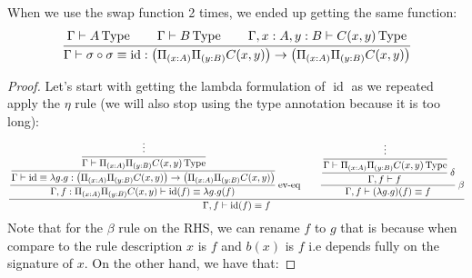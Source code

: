 \begin{lemma}
    \label{lemma:swap-two-time}
    When we use the swap function 2 times, we ended up getting the same function:
    \begin{equation*}
        \cfrac{\Gamma\vdash A\operatorname{Type} \qquad \Gamma\vdash B\operatorname{Type}\qquad \Gamma, x:A, y:B\vdash C(x, y)\operatorname{Type}
        }{\Gamma\vdash\sigma\circ\sigma\equiv\operatorname{id}:\big( \Pi_{(x:A)}\Pi_{(y:B)}C(x, y) \big)\to\big( \Pi_{(x:A)}\Pi_{(y:B)}C(x, y) \big)}
    \end{equation*}
\end{lemma}
\begin{dem}
\begin{proof}
    Let's start with getting the lambda formulation of $\operatorname{id}$ as we repeated apply the $\eta$ rule (we will also stop using the type annotation because it is too long):
    \begin{equation*}
        \cfrac{\cfrac{\cfrac{\cfrac{\vdots}{\Gamma\vdash \Pi_{(x:A)}\Pi_{(y:B)}C(x, y)\operatorname{Type}}}{\Gamma\vdash\operatorname{id}\equiv \lambda g.g:\big( \Pi_{(x:A)}\Pi_{(y:B)}C(x, y)\big)\to\big( \Pi_{(x:A)}\Pi_{(y:B)}C(x, y)\big)}}{\Gamma, f:\Pi_{(x:A)}\Pi_{(y:B)}C(x, y)\vdash\operatorname{id}(f)\equiv \lambda g.g(f)}\text{ ev-eq}\qquad\cfrac{\cfrac{\cfrac{\vdots}{\Gamma\vdash\Pi_{(x:A)}\Pi_{(y:B)}C(x, y)\operatorname{Type}}}{\Gamma, f\vdash f} \ \delta}{\Gamma, f\vdash (\lambda g.g)(f)\equiv f}\ \beta}{\Gamma ,f\vdash\operatorname{id}(f)\equiv f}
    \end{equation*}
    Note that for the $\beta$ rule on the RHS, we can rename $f$ to $g$ that is because when compare to the rule description $x$ is $f$ and $b(x)$ is $f$ i.e depends fully on the signature of $x$. On the other hand, we have that:


\end{proof}
\end{dem}
